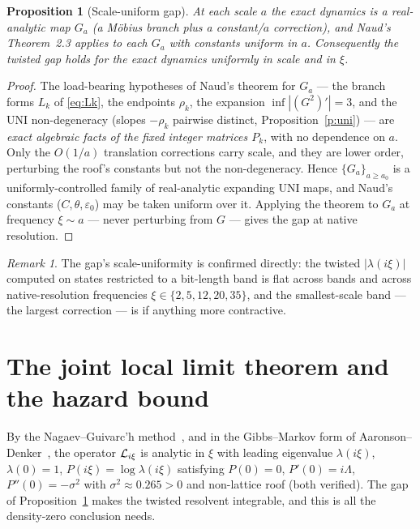 \documentclass[11pt]{article}
\newtheorem{proposition}{Proposition}\newtheorem{corollary}{Corollary}
\theoremstyle{definition}\newtheorem{definition}{Definition}
\theoremstyle{remark}\newtheorem{remark}{Remark}
\begin{document}
\begin{proposition}[Scale-uniform gap]\label{p:scale}
At each scale $a$ the exact dynamics is a real-analytic map $G_a$ (a M\"obius
branch plus a constant/$a$ correction), and Naud's Theorem~2.3 applies to each
$G_a$ with constants uniform in $a$. Consequently the twisted gap holds for the
exact dynamics uniformly in scale and in $\xi$.
\end{proposition}
\begin{proof}
The load-bearing hypotheses of Naud's theorem for $G_a$ --- the branch forms
$L_k$ of \eqref{eq:Lk}, the endpoints $\rho_k$, the expansion
$\inf|(G^2)'|=3$, and the UNI non-degeneracy (slopes $-\rho_k$ pairwise
distinct, Proposition~\ref{p:uni}) --- are \emph{exact algebraic facts of the
fixed integer matrices $P_k$}, with no dependence on $a$. Only the $O(1/a)$
translation corrections carry scale, and they are lower order, perturbing the
roof's constants but not the non-degeneracy. Hence $\{G_a\}_{a\ge a_0}$ is a
uniformly-controlled family of real-analytic expanding UNI maps, and Naud's
constants ($C,\theta,\varepsilon_0$) may be taken uniform over it. Applying the
theorem to $G_a$ at frequency $\xi\sim a$ --- never perturbing from $G$ ---
gives the gap at native resolution.
\end{proof}
\begin{remark}
The gap's scale-uniformity is confirmed directly: the twisted $|\lambda(i\xi)|$
computed on states restricted to a bit-length band is flat across bands and
across native-resolution frequencies $\xi\in\{2,5,12,20,35\}$, and the
smallest-scale band --- the largest correction --- is if anything more
contractive.
\end{remark}

\section{The joint local limit theorem and the hazard bound}\label{sec:llt}
By the Nagaev--Guivarc'h method~\cite{Nagaev1957,GuivarchHardy1988,
HennionHerve2001}, and in the Gibbs--Markov form of
Aaronson--Denker~\cite{AaronsonDenker2001}, the operator $\mathcal L_{i\xi}$ is
analytic in $\xi$ with leading eigenvalue $\lambda(i\xi)$, $\lambda(0)=1$,
$P(i\xi)=\log\lambda(i\xi)$ satisfying $P(0)=0$, $P'(0)=i\Lambda$,
$P''(0)=-\sigma^2$ with $\sigma^2\approx0.265>0$ and non-lattice roof (both
verified). The gap of Proposition~\ref{p:scale} makes the twisted resolvent
integrable, and this is all the density-zero conclusion needs.
\end{document}
